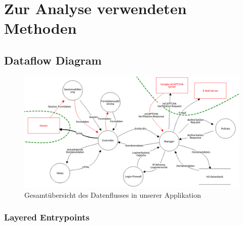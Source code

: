 \documentclass[12pt,DIV14,BCOR10mm,a4paper,parskip=half-,headsepline,headinclude,english,ngerman,bibliography=totocnumbered]{scrreprt}
\begin{document}
\vspace*{-3cm}

\tableofcontents  %

\printbibliography

\chapter{Zur Analyse verwendeten Methoden}
\section{Dataflow Diagram}

\begin{figure}[htbp]
  \hspace*{-1.75cm}
  \label{overview-dfd-pic}
  \includegraphics[width=1.25\linewidth]{resources/overview-dfd.jpg}
  \caption{Gesamtübersicht des Datenflusses in unserer Applikation}
\end{figure}

\subsection{Layered Entrypoints}
\end{document}
